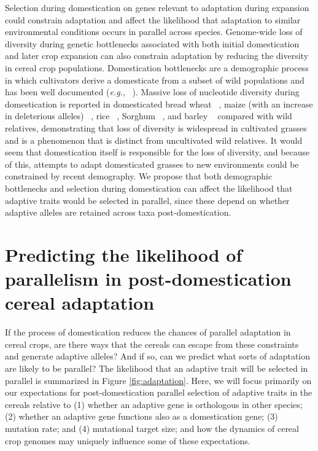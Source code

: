\documentclass[12pt]{article}
\begin{document}
Selection during domestication on genes relevant to adaptation during expansion could constrain adaptation and affect the likelihood that adaptation to similar environmental conditions occurs in parallel across species. 
Genome-wide loss of diversity during genetic bottlenecks associated with both initial domestication and later crop expansion can also constrain adaptation by reducing the diversity in cereal crop populations. Domestication bottlenecks are a demographic process in which cultivators derive a domesticate from a subset of wild populations and has been well documented (\emph{e.g.}, ~\citep{Wang2017}).
Massive loss of nucleotide diversity during domestication is reported in domesticated bread wheat ~\citep{Haudry2007}, maize (with an increase in deleterious alleles) ~\citep{pmid9539756, Wang2017}, rice ~\citep{pmid17218640}, Sorghum ~\citep{Hamblin2006}, and barley ~\citep{Kilian2006} compared with wild relatives, demonstrating that loss of diversity is widespread in cultivated grasses and is a phenomenon that is distinct from uncultivated wild relatives. It would seem that domestication itself is responsible for the loss of diversity, and because of this, attempts to adapt domesticated grasses to new environments could be constrained by recent demography.  
We propose that both demographic bottlenecks and selection during domestication can affect the likelihood that adaptive traits would be selected in parallel, since these depend on whether adaptive alleles are retained across taxa post-domestication.


\paragraph{}

\section*{Predicting the likelihood of parallelism in post-domestication cereal adaptation}
If the process of domestication reduces the chances of parallel adaptation in cereal crops, are there ways that the cereals can escape from these constraints and generate adaptive alleles? And if so, can we predict what sorts of  adaptation are likely to be parallel? The likelihood that an adaptive trait will be selected in parallel is summarized in Figure \ref{fig:adaptation}. Here, we will focus primarily on our expectations for post-domestication parallel selection of adaptive traits in the cereals relative to (1) whether an adaptive gene is orthologous in other species; (2) whether an adaptive gene functions also as a domestication gene; (3) mutation rate; and (4) mutational target size; and how the dynamics of cereal crop genomes may uniquely influence some of these expectations. 
\end{document}
